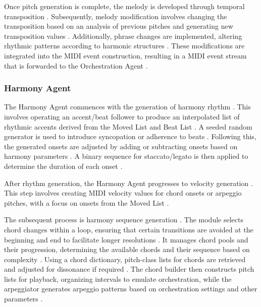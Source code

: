 Once pitch generation is complete, the melody is developed through temporal transposition \cite{lopez2023progressive}. Subsequently, melody modification involves changing the transposition based on an analysis of previous pitches and generating new transposition values \cite{lopez2023progressive}. Additionally, phrase changes are implemented, altering rhythmic patterns according to harmonic structures \cite{lopez2023progressive}. These modifications are integrated into the MIDI event construction, resulting in a MIDI event stream that is forwarded to the Orchestration Agent \cite{lopez2023progressive}.

\subsubsection{Harmony Agent}

The Harmony Agent commences with the generation of harmony rhythm \cite{lopez2023progressive}. This involves operating an accent/beat follower to produce an interpolated list of rhythmic accents derived from the Moved List and Beat List \cite{lopez2023progressive}. A seeded random generator is used to introduce syncopation or adherence to beats \cite{lopez2023progressive}. Following this, the generated onsets are adjusted by adding or subtracting onsets based on harmony parameters \cite{lopez2023progressive}. A binary sequence for staccato/legato is then applied to determine the duration of each onset \cite{lopez2023progressive}.

After rhythm generation, the Harmony Agent progresses to velocity generation \cite{lopez2023progressive}. This step involves creating MIDI velocity values for chord onsets or arpeggio pitches, with a focus on onsets from the Moved List \cite{lopez2023progressive}.

The subsequent process is harmony sequence generation \cite{lopez2023progressive}. The module selects chord changes within a loop, ensuring that certain transitions are avoided at the beginning and end to facilitate longer resolutions \cite{lopez2023progressive}. It manages chord pools and their progression, determining the available chords and their sequence based on complexity \cite{lopez2023progressive}. Using a chord dictionary, pitch-class lists for chords are retrieved and adjusted for dissonance if required \cite{lopez2023progressive}. The chord builder then constructs pitch lists for playback, organizing intervals to emulate orchestration, while the arpeggiator generates arpeggio patterns based on orchestration settings and other parameters \cite{lopez2023progressive}.

